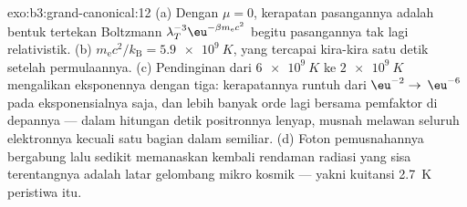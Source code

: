 \begin{solution}{exo:b3:grand-canonical:12}
(a) Dengan $\mu = 0$, kerapatan pasangannya adalah bentuk tertekan
Boltzmann $\lambda_T^{-3}\eu^{-\beta m_{\text{e}}c^2}$ begitu pasangannya
tak lagi relativistik. (b) $m_{\text{e}}c^2/k_{\text{B}} =
\qty{5.9e9}{K}$, yang tercapai kira-kira satu detik setelah permulaannya.
(c) Pendinginan dari $\qty{6e9}{K}$ ke $\qty{2e9}{K}$ mengalikan
eksponennya dengan tiga: kerapatannya runtuh dari $\eu^{-2} \to$
$\eu^{-6}$ pada eksponensialnya saja, dan lebih banyak orde lagi bersama
pemfaktor di depannya --- dalam hitungan detik positronnya lenyap, musnah
melawan seluruh elektronnya kecuali satu bagian dalam semiliar. (d) Foton
pemusnahannya bergabung lalu sedikit memanaskan kembali rendaman radiasi
yang sisa terentangnya adalah latar gelombang mikro kosmik
--- yakni kuitansi \qty{2.7}{K} peristiwa itu.
\end{solution}

